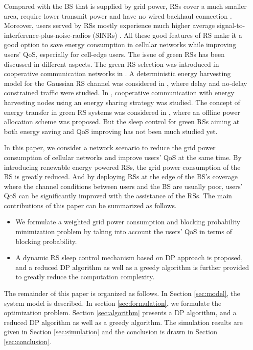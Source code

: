 \documentclass[conference]{IEEEtran}
\begin{document}
 Compared with the BS that is supplied by grid power, RSs cover a much smaller area, require lower transmit power and have no wired backhaul connection \cite{Roberto2011Energy}. Moreover, users served by RSs mostly experience much higher average signal-to-interference-plus-noise-radios (SINRs) \cite{Mikio2010Relay}. All these good features of RS make it a good option to save energy consumption in cellular networks while improving users' QoS, especially for cell-edge users. The issue of green RSs has been discussed in different aspects. The green RS selection was introduced in cooperative communication networks in \cite{Bhargav2010Voluntary}. A deterministic energy harvesting model for the Gaussian RS channel was considered in \cite{Chuan2013Throughput},\cite{Chuan2012Outage}
 where delay and no-delay constrained traffic were studied. In \cite{Kaya2013Cooperative}, cooperative communication with energy harvesting nodes using an energy sharing strategy was studied. The concept of energy transfer in green RS systems was considered in \cite{Berk2013Energy}, where an offline power allocation scheme was proposed. But the sleep control for green RSs aiming at both energy saving and QoS improving has not been much studied yet.

In this paper, we consider a network scenario to reduce the grid power consumption of cellular networks and improve users' QoS at the same time. By introducing renewable energy powered RSs, the grid power consumption of the BS is greatly reduced. And by deploying RSs at the edge of the BS's coverage where the channel conditions between users and the BS are usually poor, users' QoS can be significantly improved with the assistance of the RSs. The main contributions of this paper can be summarized as follows.
  \begin{itemize}
  \item We formulate a weighted grid power consumption and blocking probability minimization problem by taking into account the users' QoS in terms of blocking probability.
  \item A dynamic RS sleep control mechanism based on DP approach is proposed, and a reduced DP algorithm as well as a greedy algorithm is further provided to greatly reduce the computation complexity.
 \end{itemize}

 The remainder of this paper is organized as follows. In Section \ref{sec:model}, the system model is described. In section \ref{sec:formulation}, we formulate the optimization problem. Section \ref{sec:algorithm} presents a DP algorithm, and a reduced DP algorithm as well as a greedy algorithm. The simulation results are given in Section \ref{sec:simulation} and the conclusion is drawn in Section \ref{sec:conclusion}.
\end{document}
